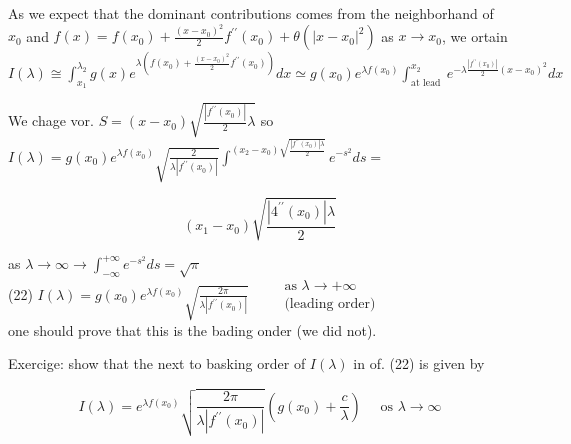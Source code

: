 \documentclass[10pt]{article}
\begin{document}
As we expect that the dominant contributions comes from the neighborhand of $x_{0}$ and $f(x)=f\left(x_{0}\right)+\frac{\left(x-x_{0}\right)^{2}}{2} f^{\prime \prime}\left(x_{0}\right) +\theta\left(\left|x-x_{0}\right|^{2}\right)$ as $x \rightarrow x_{0}$, we ortain\\
$I(\lambda) \cong \int_{x_{1}}^{\lambda_{2}} g(x) e^{\lambda\left(f\left(x_{0}\right)+\frac{\left(x-x_{0}\right)^{2}}{2} f^{\prime \prime}\left(x_{0}\right)\right)} d x \simeq g\left(x_{0}\right) e^{\lambda f\left(x_{0}\right)} \int_{\text {at lead }}^{x_{2}} e^{-\lambda \frac{\left|f^{\prime \prime}\left(x_{0}\right)\right|}{2}\left(x-x_{0}\right)^{2}} d x$

We chage vor. $S=\left(x-x_{0}\right) \sqrt{\frac{\left|f^{\prime \prime}\left(x_{0}\right)\right|}{2} \lambda}$ so\\
$I(\lambda)=g\left(x_{0}\right) e^{\lambda f\left(x_{0}\right)} \sqrt{\frac{2}{\lambda\left|f^{\prime \prime}\left(x_{0}\right)\right|}} \int^{\left(x_{2}-x_{0}\right) \sqrt{\frac{\left|f^{\prime \prime}\left(x_{0}\right)\right| \lambda}{2}}} e^{-s^{2}} d s=$

$$
\left(x_{1}-x_{0}\right) \sqrt{\frac{\left|4^{\prime \prime}\left(x_{0}\right)\right| \lambda}{2}}
$$

as $\lambda \rightarrow \infty \rightarrow \int_{-\infty}^{+\infty} e^{-s^{2}} d s=\sqrt{\pi}$\\
(22) $I(\lambda)=g\left(x_{0}\right) e^{\lambda f\left(x_{0}\right)} \sqrt{\frac{2 \pi}{\lambda\left|f^{\prime \prime}\left(x_{0}\right)\right|}} \quad \begin{aligned} & \text { as } \lambda \rightarrow+\infty \\ & \text { (leading order) }\end{aligned}$\\
one should prove that this is the bading onder (we did not).

Exercige: show that the next to basking order of $I(\lambda)$ in of. (22) is given by

$$
I(\lambda)=e^{\lambda f\left(x_{0}\right)} \sqrt{\frac{2 \pi}{\lambda\left|f^{\prime \prime}\left(x_{0}\right)\right|}}\left(g\left(x_{0}\right)+\frac{c}{\lambda}\right) \quad \text { os } \lambda \rightarrow \infty
$$
\end{document}
